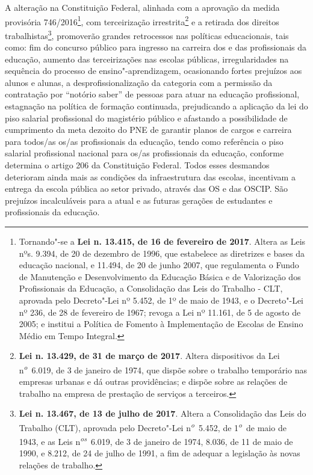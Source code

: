 A alteração na Constituição Federal, alinhada com a aprovação da medida
provisória 746/2016\footnote{Tornando"-se a \textbf{Lei n. 13.415, de 16
  de fevereiro de 2017}. Altera as Leis nºs. 9.394, de 20 de dezembro de
  1996, que estabelece as diretrizes e bases da educação nacional, e
  11.494, de 20 de junho 2007, que regulamenta o Fundo de Manutenção e
  Desenvolvimento da Educação Básica e de Valorização dos Profissionais
  da Educação, a Consolidação das Leis do Trabalho - CLT, aprovada pelo
  Decreto"-Lei nº 5.452, de 1º de maio de 1943, e o Decreto"-Lei nº 236,
  de 28 de fevereiro de 1967; revoga a Lei nº 11.161, de 5 de agosto de
  2005; e institui a Política de Fomento à Implementação de Escolas de
  Ensino Médio em Tempo Integral.}, com terceirização
irrestrita\footnote{\textbf{Lei n. 13.429, de 31 de março de 2017}.
  Altera dispositivos da Lei n\textsuperscript{\emph{o}}~6.019, de 3 de
  janeiro de 1974, que dispõe sobre o trabalho temporário nas empresas
  urbanas e dá outras providências; e dispõe sobre as relações de
  trabalho na empresa de prestação de serviços a terceiros.} e a
retirada dos direitos trabalhistas\footnote{\textbf{Lei n. 13.467, de 13
  de julho de 2017}. Altera a Consolidação das Leis do Trabalho (CLT),
  aprovada pelo Decreto"-Lei n\textsuperscript{\emph{o}}~5.452, de
  1\textsuperscript{\emph{o}}~de maio de 1943, e as Leis
  n\textsuperscript{\emph{os}}~6.019, de 3 de janeiro de 1974, 8.036, de
  11 de maio de 1990, e 8.212, de 24 de julho de 1991, a fim de adequar
  a legislação às novas relações de trabalho.}, promoverão grandes
retrocessos nas políticas educacionais, tais como: fim do concurso
público para ingresso na carreira dos e das profissionais da educação,
aumento das terceirizações nas escolas públicas, irregularidades na
sequência do processo de ensino"-aprendizagem, ocasionando fortes
prejuízos aos alunos e alunas, a desprofissionalização da categoria com
a permissão da contratação por ``notório saber'' de pessoas para atuar
na educação profissional, estagnação na política de formação continuada,
prejudicando a aplicação da lei do piso salarial profissional do
magistério público e afastando a possibilidade de cumprimento da meta
dezoito do PNE de garantir planos de cargos e carreira para todos/as
os/as profissionais da educação, tendo como referência o piso salarial
profissional nacional para os/as profissionais da educação, conforme
determina o artigo 206 da Constituição Federal. Todos esses desmandos
deterioram ainda mais as condições da infraestrutura das escolas,
incentivam a entrega da escola pública ao setor privado, através das OS
e das OSCIP. São prejuízos incalculáveis para a atual e as futuras
gerações de estudantes e profissionais da educação.

